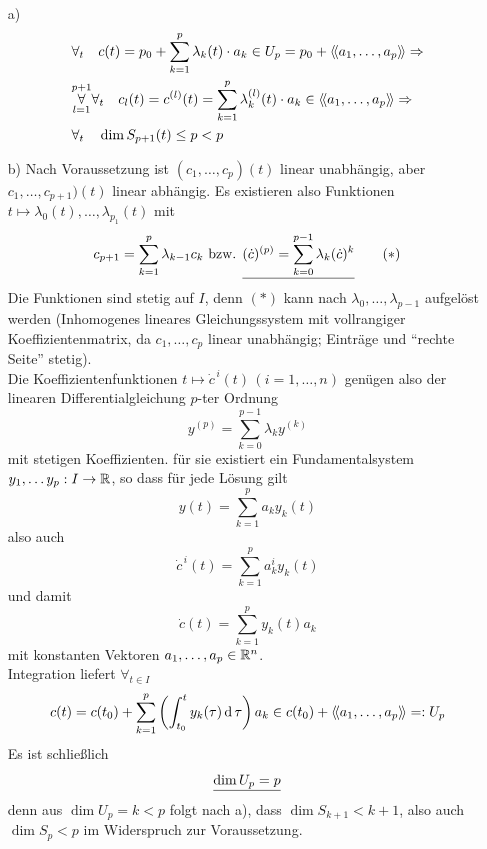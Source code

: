 \begin{beweis} \(\)
 \begin{enumerate}
  \item[a)]
  \begin{align*}
   &\forall_t \quad c(t) = p_0 + \sum_{k=1}^p \lambda_k(t) \cdot a_k \in U_p = p_0 + \left\langle\!\left\langle a_1, \dots, a_p \right\rangle\!\right\rangle \Rightarrow \\
   &\overset{p+1}{\underset{l=1}\forall} \forall_t \quad c_l(t)= c^{(l)}(t) = \sum_{k=1}^p \lambda_k^{(l)}(t)\cdot a_k \in \left\langle\!\left\langle a_1, \dots, a_p \right\rangle\!\right\rangle \Rightarrow \\
   & \forall_t \quad \dim S_{p+1}(t) \le p < p
  \end{align*}
  \item[b)] Nach Voraussetzung ist \((c_1, \dots, c_p)(t) \) linear unabhängig, aber \(c_1, \dots, c_{p+1})(t) \) linear abhängig. Es existieren also Funktionen \(t \mapsto \lambda_0(t), \dots, \lambda_{p_1}(t)\) mit 
  \begin{align*}
   c_{p+1} = \sum_{k=1}^p \lambda_{k-1} c_k \text{ bzw. } \uline{(\dot c)^{(p)} = \sum_{k=0}^{p-1} \lambda_k (\dot c)^k} \tag{\(\ast\)}
  \end{align*}
  Die Funktionen sind stetig auf \(I\), denn \((\ast)\) kann nach \(\lambda_0, \dots, \lambda_{p-1}\) aufgelöst werden (Inhomogenes lineares Gleichungssystem mit vollrangiger Koeffizientenmatrix, da \(c_1, \dots, c_p\) linear unabhängig; Einträge und "`rechte Seite"' stetig). \\
  Die Koeffizientenfunktionen \(t \mapsto \dot c^{\,i}(t) \, (i=1,\dots, n)\) genügen also der linearen Differentialgleichung \(p\)-ter Ordnung
  \[
   y^{(p)} = \sum_{k=0}^{p-1} \lambda_k y^{(k)}
  \]
  mit stetigen Koeffizienten.
  für sie existiert ein Fundamentalsystem \(y_1, \dots y_p : I \to \mathbb{R}\), so dass für jede Lösung gilt
  \[
   y(t)=\sum_{k=1}^p a_k y_k(t)
  \]
  also auch
  \[
   \dot c^{\,i}(t)=\sum_{k=1}^p a_k^i y_k(t)
  \]
  und damit
  \[
   \dot c(t)=\sum_{k=1}^p y_k(t) a_k
  \]
  mit konstanten Vektoren \(a_1, \dots, a_p \in \mathbb{R}^n\). \\
  Integration liefert \(\forall_{t \in I}\)
  \[
   c(t)= c(t_0) + \sum_{k=1}^p \left(\int_{t_0}^t y_k(\tau) \operatorname{d} \tau \right) a_k \in c(t_0) + \left\langle\!\left\langle a_1, \dots, a_p \right\rangle\!\right\rangle =: U_p
  \]
  Es ist schließlich 
  \[
  \uline{\dim U_p =p}
  \] 
  denn aus \(\dim U_p = k < p\) folgt nach a), dass \( \dim S_{k+1} < k+1 \), also auch \(\dim S_p <p\) im Widerspruch zur Voraussetzung.
 \end{enumerate}
  
\end{beweis}